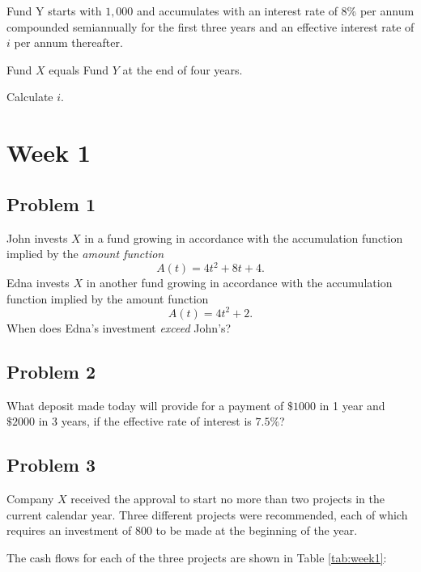 \documentclass[
]{book}
\begin{document}
Fund Y starts with \(1,000\) and accumulates with an interest rate of 8\% per annum compounded semiannually for the first three years and an effective interest rate of \(i\) per annum thereafter.

Fund \(X\) equals Fund \(Y\) at the end of four years.

Calculate \(i\).

\hypertarget{week-1}{%
\section*{Week 1}\label{week-1}}

\hypertarget{problem-1-2}{%
\subsection*{Problem 1}\label{problem-1-2}}

John invests \(X\) in a fund growing in accordance with the accumulation function implied by the \emph{amount function}
\[A(t)=4t^2+8t+4.\]
Edna invests \(X\) in another fund growing in accordance with the accumulation function implied by the amount function \[A(t)=4t^2+2.\]
When does Edna's investment \emph{exceed} John's?

\hypertarget{problem-2-2}{%
\subsection*{Problem 2}\label{problem-2-2}}

What deposit made today will provide for a payment of \(\$1000\) in 1 year and \(\$2000\) in 3 years, if the effective rate of interest is \(7.5\%\)?

\hypertarget{problem-3-2}{%
\subsection*{Problem 3}\label{problem-3-2}}

Company \(X\) received the approval to start no more than two projects in the current calendar year.
Three different projects were recommended, each of which requires an investment of 800 to be made at the beginning of the year.

The cash flows for each of the three projects are shown in Table \ref{tab:week1}:
\end{document}
